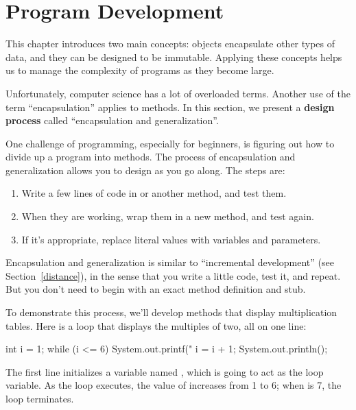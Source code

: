\section{Program Development}
\label{encapsulation}

This chapter introduces two main concepts: objects encapsulate other types of data, and they can be designed to be immutable.
Applying these concepts helps us to manage the complexity of programs as they become large.


Unfortunately, computer science has a lot of overloaded terms.
Another use of the term ``encapsulation'' applies to methods.
In this section, we present a {\bf design process} called ``encapsulation and generalization''.

One challenge of programming, especially for beginners, is figuring out how to divide up a program into methods.
The process of encapsulation and generalization allows you to design as you go along.
The steps are:

\begin{enumerate}
\item Write a few lines of code in  or another method, and test them.
\item When they are working, wrap them in a new method, and test again.
\item If it's appropriate, replace literal values with variables and parameters.
\end{enumerate}

Encapsulation and generalization is similar to ``incremental development'' (see Section~\ref{distance}), in the sense that you write a little code, test it, and repeat.
But you don't need to begin with an exact method definition and stub.


To demonstrate this process, we'll develop methods that display multiplication tables.
Here is a loop that displays the multiples of two, all on one line:

\begin{code}
int i = 1;
while (i <= 6) {
    System.out.printf("%
    i = i + 1;
}
System.out.println();
\end{code}


The first line initializes a variable named , which is going to act as the loop variable.
As the loop executes, the value of  increases from 1 to 6; when  is 7, the loop terminates.

